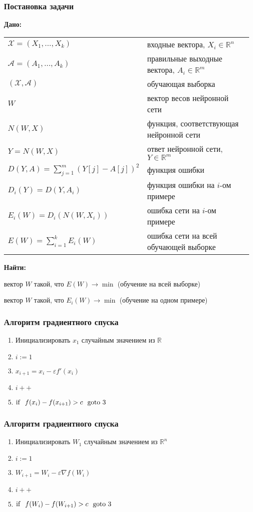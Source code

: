 \documentclass[24pt,pdf,hyperref={unicode},aspectratio=169]{beamer}
\begin{document}
\begin{frame}\frametitle{Постановка задачи}
{\bf Дано:}
\begin{tabular}{p{6cm} p{7.5cm}}
 $\mathcal{X}=(X_1,\ldots,X_k)$ & входные вектора, $X_i\in\mathbb{R}^n$\\[0.1cm]
 $\mathcal{A}=(A_1,\ldots,A_k)$ & правильные выходные вектора, $A_i\in\mathbb{R}^m$\\[0.1cm]
 $(\mathcal{X},\mathcal{A})$ & обучающая выборка  \\[0.1cm]
 $W$ & вектор весов нейронной сети \\[0.1cm]
 $N(W,X)$ & функция, соответствующая нейронной сети \\[0.1cm]
 $Y=N(W,X)$ & ответ нейронной сети, $Y\in\mathbb{R}^m$ \\[0.1cm]
 $D(Y,A) =\sum_{j=1}^{m} (Y[j]-A[j])^2$ & функция ошибки\\[0.1cm]
 $D_i(Y)=D(Y,A_i) $ & функция ошибки на $i$-ом примере \\[0.1cm]
  $E_i(W)=D_i(N(W,X_i))$ & ошибка сети на $i$-ом примере\\[0.1cm]
  $E(W)=\sum_{i=1}^{k}E_i(W) $ & ошибка сети на всей обучающей выборке \\[0.1cm]      
 \end{tabular}
{\bf Найти:}

вектор $W$ такой, что $E(W) \rightarrow \min$ (обучение на всей выборке)

вектор $W$ такой, что $E_i(W) \rightarrow \min$ (обучение на одном примере)

\end{frame}




\begin{frame}\frametitle{Алгоритм градиентного спуска}
\begin{enumerate}
 \item Инициализировать $x_1$ случайным значением из $\mathbb{R}$
 \item $i:=1$
 \item $x_{i+1}=x_i-\varepsilon f'(x_i)$
 \item $i++$
 \item ${\rm if}\ \ f(x_{i})-f(x_{i+1}) >c\ \ {\rm goto}\ 3$
\end{enumerate}
\end{frame}

\begin{frame}\frametitle{Алгоритм градиентного спуска}
\begin{enumerate}
 \item Инициализировать $W_1$ случайным значением из $\mathbb{R}^n$
 \item $i:=1$
 \item $W_{i+1}=W_i-\varepsilon \nabla f(W_i)$
 \item $i++$
 \item ${\rm if}\ \ f(W_{i})-f(W_{i+1})>c\ \ {\rm goto}\ 3$
\end{enumerate}
\end{frame}
\end{document}
